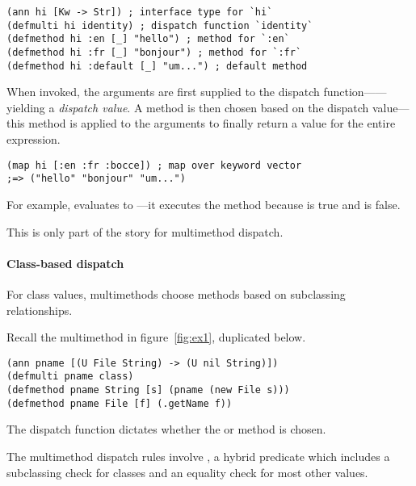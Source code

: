 \begin{exmp}
\begin{verbatim}
(ann hi [Kw -> Str]) ; interface type for `hi`
(defmulti hi identity) ; dispatch function `identity`
(defmethod hi :en [_] "hello") ; method for `:en`
(defmethod hi :fr [_] "bonjour") ; method for `:fr`
(defmethod hi :default [_] "um...") ; default method
\end{verbatim}
\label{example:hi-multimethod}
\end{exmp}

When invoked, the arguments are first supplied to the dispatch function------yielding
a \emph{dispatch value}. A method is then chosen
based on the dispatch value---this method is applied to the arguments
to finally return a value for the entire expression.

\begin{verbatim}
(map hi [:en :fr :bocce]) ; map over keyword vector 
;=> ("hello" "bonjour" "um...")
\end{verbatim}

For example, 
 evaluates to ---it executes
the  method
because  is true
and  is false.

This is only part of the story for multimethod dispatch.

\paragraph{Class-based dispatch}
For class values, multimethods choose methods based on subclassing
relationships.

Recall the multimethod in figure~\ref{fig:ex1}, duplicated below.

\begin{verbatim}
(ann pname [(U File String) -> (U nil String)])
(defmulti pname class)
(defmethod pname String [s] (pname (new File s)))
(defmethod pname File [f] (.getName f))
\end{verbatim}


The dispatch function 
dictates 
whether the  or  method is chosen.

The multimethod dispatch rules involve
, a hybrid predicate which includes a subclassing check for classes and
an equality check for most other values.

